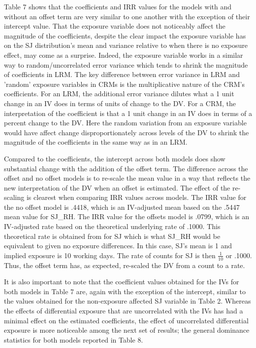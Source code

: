 \documentclass[ShortAfour,times,sageapa]{sagej}
\begin{document}
	Table 7 shows that the coefficients and IRR values for the models with and without an offset term are very similar to one another with the exception of their intercept value.
	That the exposure variable does not noticeably affect the magnitude of the coefficients, despite the clear impact the exposure variable has on the SJ distribution's mean and variance relative to when there is no exposure effect, may come as a surprise.
	Indeed, the exposure variable works in a similar way to random/uncorrelated error variance which tends to shrink the magnitude of coefficients in LRM.
	The key difference between error variance in LRM and 'random' exposure variables in CRMs is the multiplicative nature of the CRM's coefficients.
	For an LRM, the additional error variance dilutes what a 1 unit change in an IV does in terms of units of change to the DV.
	For a CRM, the interpretation of the coefficient is that a 1 unit change in an IV does in terms of a percent change to the DV.
	Here the random variation from an exposure variable would have affect change disproportionately across levels of the DV to shrink the magnitude of the coefficients in the same way as in an LRM.
	
	Compared to the coefficients, the intercept across both models does show substantial change with the addition of the offset term.
	The difference across the offset and no offset models is to re-scale the mean value in a way that reflects the new interpretation of the DV when an offset is estimated.
	The effect of the re-scaling is clearest when comparing IRR values across models.
	The IRR value for the no offset model is .4418, which is an IV-adjusted mean based on the .5447 mean value for SJ\_RH.
	The IRR value for the offsets model is .0799, which is an IV-adjusted rate based on the theoretical underlying rate of .1000.
	This theoretical rate is obtained from for SJ which is what SJ\_RH would be equivalent to given no exposure differences.
	In this case, SJ's mean is 1 and implied exposure is 10 working days.
	The rate of counts for SJ is then $\frac{1}{10}$ or .1000.
	Thus, the offset term has, as expected, re-scaled the DV from a count to a rate.
	
	It is also important to note that the coefficient values obtained for the IVs for both models in Table 7 are, again with the exception of the intercept, similar to the values obtained for the non-exposure affected SJ variable in Table 2.
	Whereas the effects of differential exposure that are uncorrelated with the IVs has had a minimal effect on the estimated coefficients, the effect of uncorrelated differential exposure is more noticeable among the next set of results; the general dominance statistics for both models reported in Table 8.
	
\end{document}
